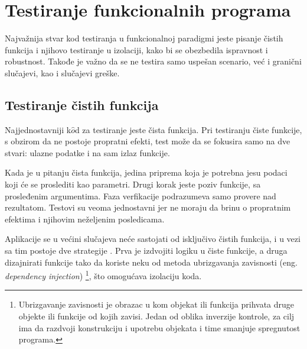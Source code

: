 \documentclass[12pt,oneside]{memoir}
\begin{document}
\section{Testiranje funkcionalnih programa}

\par Najvažnija stvar kod testiranja u funkcionalnoj paradigmi jeste pisanje čistih funkcija i njihovo testiranje u izolaciji, kako bi se obezbedila ispravnost i robustnost. Takođe je važno da se ne testira samo uspešan scenario, već i granični slučajevi, kao i slučajevi greške.

\subsection{Testiranje čistih funkcija}

\par Najjednostavniji k$\hat{o}$d za testiranje jeste čista funkcija. Pri testiranju čiste funkcije, s obzirom da ne postoje propratni efekti, test može da se fokusira samo na dve stvari: ulazne podatke i na sam izlaz funkcije. 
\par Kada je u pitanju čista funkcija, jedina priprema koja je potrebna jesu podaci koji će se proslediti kao parametri. Drugi korak jeste poziv funkcije, sa prosleđenim argumentima. Faza verfikacije podrazumeva samo provere nad rezultatom. Testovi su veoma jednostavni jer ne moraju da brinu o propratnim efektima i njihovim neželjenim posledicama.
\par Aplikacije se u većini slučajeva neće sastojati od isključivo čistih funkcija, i u vezi sa tim postoje dve strategije \cite{testingelixir}. Prva je izdvojiti logiku u čiste funkcije, a druga dizajnirati funkcije tako da koriste neku od metoda ubrizgavanja zavisnosti (eng. \textit{dependency injection}) \footnote{Ubrizgavanje zavisnosti je obrazac u kom objekat ili funkcija prihvata druge objekte ili funkcije od kojih zavisi. Jedan od oblika inverzije kontrole, za cilj ima da razdvoji konstrukciju i upotrebu objekata i time smanjuje spregnutost programa.}, što omogućava izolaciju koda.
\end{document}
